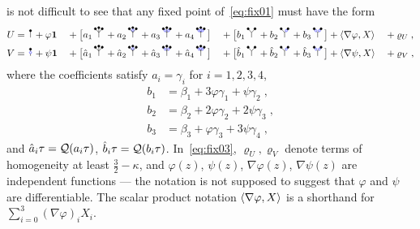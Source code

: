 \documentclass[reqno,11pt]{article}
\def\unit{\vone}
\begin{document}
is not difficult to see that any fixed point of~\eqref{eq:fix01} must have the
form 
\begin{alignat}{4}
\nonumber
U &= \RSI + \varphi\unit 
&&{}+{} \bigbrak{a_1\RSIW + a_2\RSIWo + a_3\RSIWoo + a_4\RSIWooo} 
&&{}+{} \bigbrak{b_1\RSY + b_2\RSYo + b_3\RSYoo} + \pscal{\nabla\varphi}{X} 
&&{}+{}\varrho_U\;,
\\
V &= \RSoI + \psi\unit
&&{}+{} \bigbrak{\hat a_1\RSIW + \hat a_2\RSIWo + \hat a_3\RSIWoo +
\hat a_4\RSIWooo}
&&{}+{} \bigbrak{\hat b_1\RSY + \hat b_2\RSYo + \hat b_3\RSYoo} +
\pscal{\nabla\psi}{X}
&&{}+{}\varrho_V\;,
\label{eq:fix03} 
\end{alignat}
where the coefficients satisfy $a_i=\gamma_i$ for $i=1,2,3,4$,
\begin{align}
\nonumber
b_1 &= \beta_1 + 3\varphi\gamma_1 +  \psi\gamma_2\;, \\
\label{eq:fix04} 
b_2 &= \beta_2 + 2\varphi\gamma_2 + 2\psi\gamma_3\;, \\
b_3 &= \beta_3 +  \varphi\gamma_3 + 3\psi\gamma_4\;,
\nonumber
\end{align}
and $\hat a_i\tau = {\mathcal Q}(a_i\tau)$, $\hat b_i\tau = {\mathcal Q}(b_i\tau)$. 
In~\eqref{eq:fix03}, $\varrho_U, \varrho_V$ denote terms of homogeneity at least
$\frac32 - \kappa$, and $\varphi(z)$, $\psi(z)$, $\nabla\varphi(z)$,
$\nabla\psi(z)$ are independent functions --- the notation is not supposed to
suggest that $\varphi$ and $\psi$ are differentiable. The scalar product
notation $\langle\nabla\varphi,X\rangle$ is a shorthand for $\sum_{i=0}^3
(\nabla\varphi)_i X_i$. 
\end{document}
